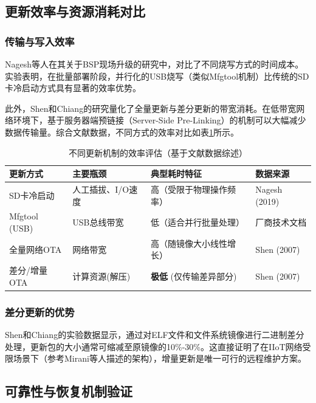 \documentclass[a4paper,12pt]{article}
\begin{document}
\subsection{更新效率与资源消耗对比}

\subsubsection{传输与写入效率}
Nagesh等人在其关于BSP现场升级的研究中，对比了不同烧写方式的时间成本。实验表明，在批量部署阶段，并行化的USB烧写（类似Mfgtool机制）比传统的SD卡冷启动方式具有显著的效率优势\cite{Nagesh2019}。

此外，Shen和Chiang的研究量化了全量更新与差分更新的带宽消耗。在低带宽网络环境下，基于服务器端预链接（Server-Side Pre-Linking）的机制可以大幅减少数据传输量\cite{Shen2007}。综合文献数据，不同方式的效率对比如表\ref{tab:efficiency_review}所示。

\begin{table}[H]
\centering
\caption{不同更新机制的效率评估（基于文献数据综述）}
\label{tab:efficiency_review}
\begin{tabular}{p{3cm}p{3cm}p{4cm}p{3cm}}
\toprule
\textbf{更新方式} & \textbf{主要瓶颈} & \textbf{典型耗时特征} & \textbf{数据来源} \\
\midrule
SD卡冷启动 & 人工插拔、I/O速度 & 高（受限于物理操作频率） & Nagesh (2019) \cite{Nagesh2019} \\
Mfgtool (USB) & USB总线带宽 & 低（适合并行批量处理） & 厂商技术文档 \\
全量网络OTA & 网络带宽 & 高（随镜像大小线性增长） & Shen (2007) \cite{Shen2007} \\
差分/增量OTA & 计算资源(解压) & \textbf{极低} (仅传输差异部分) & Shen (2007) \cite{Shen2007} \\
\bottomrule
\end{tabular}
\end{table}

\subsubsection{差分更新的优势}
Shen和Chiang的实验数据显示，通过对ELF文件和文件系统镜像进行二进制差分处理，更新包的大小通常可缩减至原镜像的10\%-30\%\cite{Shen2007}。这直接证明了在IIoT网络受限场景下（参考Mirani等人描述的架构\cite{Mirani2022}），增量更新是唯一可行的远程维护方案。

\subsection{可靠性与恢复机制验证}
\end{document}
